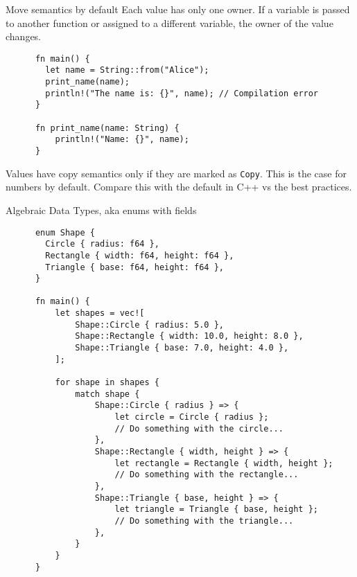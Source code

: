 \documentclass{beamer}
\begin{document}
\begin{frame}[fragile]{Move semantics by default}
  Each value has only one owner.
  If a variable is passed to another function or assigned to a different variable, the owner of the value changes.

  \vfill

  \begin{listing}
    \begin{verbatim}
      fn main() {
        let name = String::from("Alice");
        print_name(name);
        println!("The name is: {}", name); // Compilation error
      }
    
      fn print_name(name: String) {
          println!("Name: {}", name);
      }
    \end{verbatim}
  \end{listing}

  \vfill

  Values have copy semantics only if they are marked as \texttt{Copy}.
  This is the case for numbers by default. Compare this with the default in C++ vs the best practices.
\end{frame}

\begin{frame}[fragile]{Algebraic Data Types, aka enums with fields}
  \begin{listing}
    \begin{verbatim}
      enum Shape {
        Circle { radius: f64 },
        Rectangle { width: f64, height: f64 },
        Triangle { base: f64, height: f64 },
      }
    
      fn main() {
          let shapes = vec![
              Shape::Circle { radius: 5.0 },
              Shape::Rectangle { width: 10.0, height: 8.0 },
              Shape::Triangle { base: 7.0, height: 4.0 },
          ];
      
          for shape in shapes {
              match shape {
                  Shape::Circle { radius } => {
                      let circle = Circle { radius };
                      // Do something with the circle...
                  },
                  Shape::Rectangle { width, height } => {
                      let rectangle = Rectangle { width, height };
                      // Do something with the rectangle...
                  },
                  Shape::Triangle { base, height } => {
                      let triangle = Triangle { base, height };
                      // Do something with the triangle...
                  },
              }
          }
      }
    \end{verbatim}
  \end{listing}
\end{frame}
\end{document}
